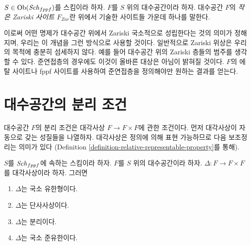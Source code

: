 \begin{definition}
\label{definition-small-Zariski-site}
$S \in \mathop{\mathrm{Ob}}\nolimits(\mathit{Sch}_{fppf})$를 스킴이라 하자. $F$를 $S$ 위의
대수공간이라 하자. 대수공간 $F$의 {\it 작은 Zariski 사이트
$F_{Zar}$}란 위에서 기술한 사이트들 가운데 하나를 말한다.
\end{definition}

\noindent
이로써 어떤 명제가 대수공간 위에서 Zariski 국소적으로 성립한다는
것의 의미가 정해지며, 우리는 이 개념을 그런 방식으로 사용할 것이다.
일반적으로 Zariski 위상은 우리의 목적에 충분히 섬세하지 않다.
예를 들어 대수공간 위의 Zariski 층들의 범주를 생각할 수 있다.
준연접층의 경우에도 이것이 올바른 대상은 아님이 밝혀질 것이다.
$F$의 에탈 사이트나 fppf 사이트를 사용하여 준연접층을 정의해야만
원하는 결과를 얻는다.











\section{대수공간의 분리 조건}
\label{section-separation}

\noindent
대수공간 $F$의 분리 조건은 대각사상 $F \to F \times F$에 관한
조건이다. 먼저 대각사상이 자동으로 갖는 성질들을 나열하자.
대각사상은 정의에 의해 표현 가능하므로 다음 보조정리는 의미가 있다
(Definition \ref{definition-relative-representable-property}를 통해).

\begin{lemma}
\label{lemma-properties-diagonal}
$S$를 $\mathit{Sch}_{fppf}$에 속하는 스킴이라 하자.
$F$를 $S$ 위의 대수공간이라 하자.
$\Delta : F \to F \times F$를 대각사상이라 하자.
그러면
\begin{enumerate}
\item $\Delta$는 국소 유한형이다.
\item $\Delta$는 단사사상이다.
\item $\Delta$는 분리이다.
\item $\Delta$는 국소 준유한이다.
\end{enumerate}
\end{lemma}

